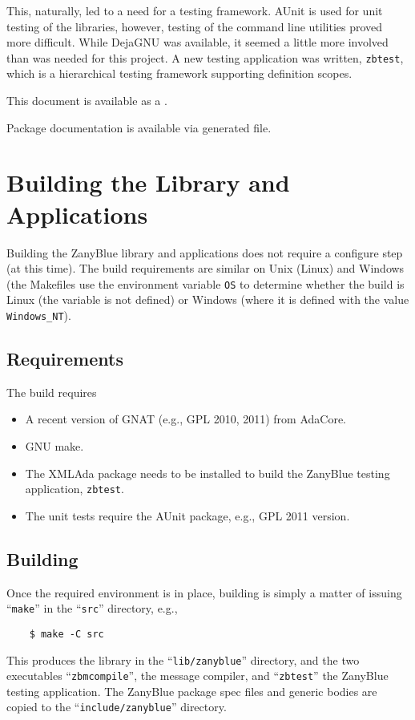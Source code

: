 This, naturally, led to a need for a testing framework.  AUnit is used for
unit testing of the libraries, however, testing of the command line utilities
proved more difficult.  While DejaGNU was available, it seemed a little more
involved than was needed for this project.  A new testing application was
written, \texttt{zbtest}, which is a hierarchical testing framework supporting
definition scopes.

\begin{htmlonly}
This document is available as a
.

Package documentation is available via
 generated file.
\end{htmlonly}

\section{Building the Library and Applications}

Building the ZanyBlue library and applications does not require a configure
step (at this time).  The build requirements are similar on Unix (Linux)
and Windows (the Makefiles use the environment variable \verb|OS| to determine
whether the build is Linux (the variable is not defined) or Windows (where it
is defined with the value \verb|Windows_NT|).

\subsection{Requirements}

The build requires
\begin{itemize}
\item A recent version of GNAT (e.g., GPL 2010, 2011) from AdaCore.
\item GNU make.
\item The XMLAda package needs to be installed to build the ZanyBlue
      testing application, \texttt{zbtest}.
\item The unit tests require the AUnit package, e.g., GPL 2011 version.
\end{itemize}

\subsection{Building}

Once the required environment is in place, building is simply a matter of
issuing ``\texttt{make}'' in the ``\texttt{src}'' directory, e.g.,
\begin{small}
\begin{verbatim}
    $ make -C src
\end{verbatim}
\end{small}
This produces the library in the ``\texttt{lib/zanyblue}'' directory,
and the two executables ``\texttt{zbmcompile}'', the message compiler,
and ``\texttt{zbtest}'' the ZanyBlue testing application.  The ZanyBlue
package spec files and generic bodies are copied to the
``\texttt{include/zanyblue}'' directory.

